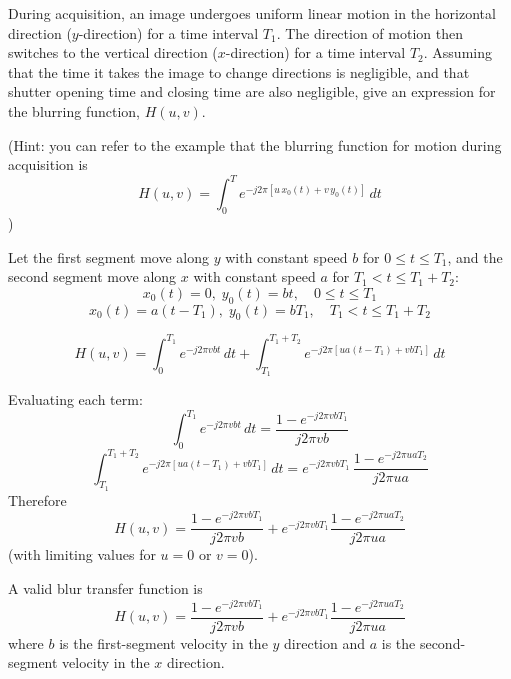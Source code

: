 \documentclass[12pt]{article}
\begin{document}
During acquisition, an image undergoes uniform linear motion in the horizontal direction ($y$-direction)
for a time interval $T_1$. The direction of motion then switches to the vertical direction ($x$-direction)
for a time interval $T_2$. Assuming that the time it takes the image to change directions is negligible,
and that shutter opening time and closing time are also negligible, give an expression for the blurring
function, $H(u,v)$.

(Hint: you can refer to the example that the blurring function for motion during acquisition is
\[
H(u,v) = \int_{0}^{T} e^{-j2\pi\left[u\,x_0(t)+v\,y_0(t)\right]}\,dt
\]
)

\vspace{0.4cm}

\begin{stepbox}
Let the first segment move along $y$ with constant speed $b$ for $0\le t\le T_1$, and the second segment move along $x$ with constant speed $a$ for $T_1 < t \le T_1+T_2$:
\[
x_0(t)=0,\; y_0(t)=bt, \quad 0\le t\le T_1
\]
\[
x_0(t)=a(t-T_1),\; y_0(t)=bT_1, \quad T_1< t\le T_1+T_2
\]
\end{stepbox}

\begin{stepbox}
\[
H(u,v)=\int_0^{T_1} e^{-j2\pi vbt}\,dt
+\int_{T_1}^{T_1+T_2} e^{-j2\pi\left[u a(t-T_1)+v bT_1\right]}\,dt
\]
\end{stepbox}

\begin{stepbox}
Evaluating each term:
\[
\int_0^{T_1} e^{-j2\pi vbt}\,dt
=\frac{1-e^{-j2\pi vbT_1}}{j2\pi vb}
\]
\[
\int_{T_1}^{T_1+T_2} e^{-j2\pi\left[u a(t-T_1)+v bT_1\right]}\,dt
=e^{-j2\pi vbT_1}\,\frac{1-e^{-j2\pi uaT_2}}{j2\pi ua}
\]
Therefore
\[
H(u,v)=\frac{1-e^{-j2\pi vbT_1}}{j2\pi vb}
+e^{-j2\pi vbT_1}\frac{1-e^{-j2\pi uaT_2}}{j2\pi ua}
\]
(with limiting values for $u=0$ or $v=0$).
\end{stepbox}

\begin{resultsbox}
A valid blur transfer function is
\[
\boxed{H(u,v)=\frac{1-e^{-j2\pi vbT_1}}{j2\pi vb}
+e^{-j2\pi vbT_1}\frac{1-e^{-j2\pi uaT_2}}{j2\pi ua}}
\]
where $b$ is the first-segment velocity in the $y$ direction and $a$ is the second-segment velocity in the $x$ direction.
\end{resultsbox}


\end{document}

